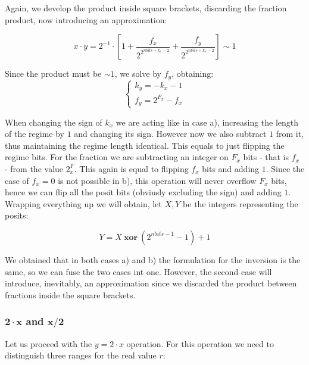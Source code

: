 Again, we develop the product inside square brackets, discarding the fraction product, now introducing an approximation:

\begin{equation}
    x \cdot y = 2^{-1} \cdot \left[ 1 + \frac{f_x}{2^{2^{nbits + k_x - 2}}}  + \frac{f_y}{2^{2^{nbits + k_x - 2}}} \right] \sim 1
\end{equation}

Since the product must be $\sim 1$, we solve by $f_y$, obtaining:
\begin{equation}
\left\{\begin{matrix}
k_y = -k_x - 1 \\
f_y = 2^{F_x} - f_x
\end{matrix}\right.
\end{equation}

When changing the sign of $k_x$ we are acting like in case a), increasing the length of the regime by $1$ and changing its sign. However now we also subtract $1$ from it, thus maintaining the regime length identical. This equals to just flipping the regime bits.  For the fraction we are subtracting an integer on $F_x$ bits - that is $f_x$ - from the value $2^F_x$. This again is equal to flipping $f_x$ bits and adding $1$. Since the case of $f_x = 0$ is not possible in b), this operation will never overflow $F_x$ bits, hence we can flip all the posit bits (obviusly excluding the sign) and adding $1$. Wrapping everything up we will obtain, let $X,Y$ be the integers representing the posits:

\begin{equation}
    Y = X\ \mathbf{xor}\ (2^{nbits - 1} - 1) + 1
\end{equation}


We obtained that in both cases a) and b) the formulation for the inversion is the same, so we can fuse the two cases int one. However, the second case will introduce, inevitably, an approximation since we discarded the product between fractions inside the square brackets.


\subsubsection{$\mathbf{2\cdot x}$ and $\mathbf{x/2}$}

Let us proceed with the $y = 2\cdot x$ operation. For this operation we need to distinguish three ranges for the real value $r$:


